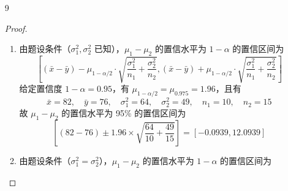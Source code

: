\documentclass[normal,founder,mtpro2,cn]{elegantnote}
\begin{document}
\begin{enumerate}
\begin{proof}
\begin{enumerate}
\begin{equation*}
                      \end{equation*}
                      且有 $s=35.2176$。故 $\sigma^{2}$ 的置信水平为 95\% 的置信区间为
                      \begin{equation*}
                          \left[\frac{9\times 35.2176^{2}}{19.0228},\frac{9\times 35.2176^{2}}{2.7004}\right]=[586.7958,4133.6469]
                      \end{equation*}
                      因此，$\sigma$ 的置信水平为 95\% 的置信区间为
                      \begin{equation*}
                          [\sqrt{586.7958},\sqrt{4133.6469}]=[24.2239,64.2934]
                      \end{equation*}
            \end{enumerate}
        \end{proof}
    \item[9]
        \begin{proof}
            \begin{enumerate}
                \item 由题设条件（$\sigma_{1}^{2},\sigma_{2}^{2}$ 已知），$\mu_{1}-\mu_{2}$ 的置信水平为 $1-\alpha$ 的置信区间为
                      \begin{equation*}
                          \left[\left(\bar{x}-\bar{y}\right)-\mu_{1-\alpha/2}\cdot\sqrt{\frac{\sigma_{1}^{2}}{n_{1}}+\frac{\sigma_{2}^{2}}{n_{2}}},\left(\bar{x}-\bar{y}\right)+\mu_{1-\alpha/2}\cdot\sqrt{\frac{\sigma_{1}^{2}}{n_{1}}+\frac{\sigma_{2}^{2}}{n_{2}}}\right]
                      \end{equation*}
                      给定置信度 $1-\alpha=0.95$，有 $\mu_{1-\alpha/2}=\mu_{0.975}=1.96$，且有
                      \begin{equation*}
                          \bar{x}=82,\quad\bar{y}=76,\quad\sigma_{1}^{2}=64,\quad\sigma_{2}^{2}=49,\quad n_{1}=10,\quad n_{2}=15
                      \end{equation*}
                      故 $\mu_{1}-\mu_{2}$ 的置信水平为 95\% 的置信区间为
                      \begin{equation*}
                          \left[\left(82-76\right) \pm 1.96\times\sqrt{\frac{64}{10}+\frac{49}{15}}\right]=[-0.0939,12.0939]
                      \end{equation*}
                \item 由题设条件（$\sigma_{1}^{2}=\sigma_{2}^{2}$），$\mu_{1}-\mu_{2}$ 的置信水平为 $1-\alpha$ 的置信区间为
                      \begin{equation*}

\end{equation*}
\end{enumerate}
\end{proof}
\end{enumerate}
\end{document}

